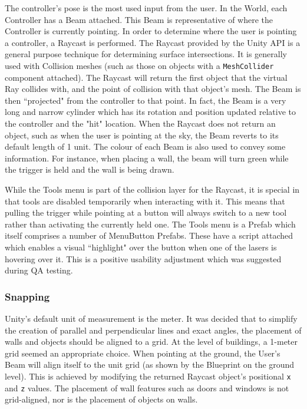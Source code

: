 The controller's pose is the most used input from the user. In the World, each Controller has a Beam attached. This Beam is representative of where the Controller is currently pointing. In order to determine where the user is pointing a controller, a Raycast is performed. The Raycast provided by the Unity API is a general purpose technique for determining surface intersections. It is generally used with Collision meshes (such as those on objects with a \verb|MeshCollider| component attached). The Raycast will return the first object that the virtual Ray collides with, and the point of collision with that object's mesh. The Beam is then ``projected" from the controller to that point. In fact, the Beam is a very long and narrow cylinder which has its rotation and position updated relative to the controller and the "hit" location. When the Raycast does not return an object, such as when the user is pointing at the sky, the Beam reverts to its default length of 1 unit. The colour of each Beam is also used to convey some information. For instance, when placing a wall, the beam will turn green while the trigger is held and the wall is being drawn.

While the Tools menu is part of the collision layer for the Raycast, it is special in that tools are disabled temporarily when interacting with it. This means that pulling the trigger while pointing at a button will always switch to a new tool rather than activating the currently held one. The Tools menu is a Prefab which itself comprises a number of MenuButton Prefabs. These have a script attached which enables a visual ``highlight" over the button when one of the lasers is hovering over it. This is a positive usability adjustment which was suggested during QA testing.

\subsubsection{Snapping}
\label{sec:ui_snap}

Unity's default unit of measurement is the meter. It was decided that to simplify the creation of parallel and perpendicular lines and exact angles, the placement of walls and objects should be aligned to a grid. At the level of buildings, a 1-meter grid seemed an appropriate choice. When pointing at the ground, the User's Beam will align itself to the unit grid (as shown by the Blueprint on the ground level). This is achieved by modifying the returned Raycast object's positional \verb|x| and \verb|z| values. The placement of wall features such as doors and windows is not grid-aligned, nor is the placement of objects on walls.


